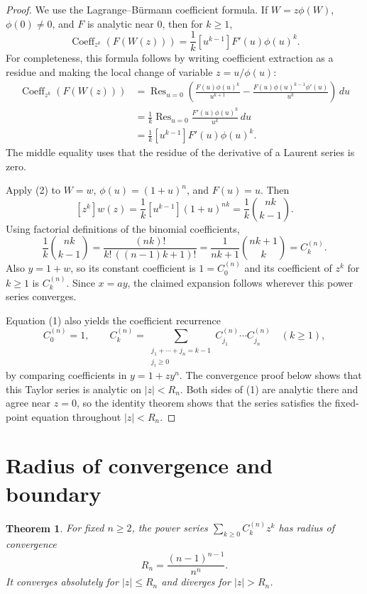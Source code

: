 \documentclass[11pt,a4paper]{article}
\newtheorem{theorem}{Theorem}
\begin{document}
\begin{proof}
We use the Lagrange--B\"urmann coefficient formula. If
$W=z\phi(W)$, $\phi(0)\neq 0$, and $F$ is analytic near $0$, then for
$k\geq 1$,
\[
\operatorname{Coeff}_{z^k}\!\left(F(W(z))\right)
=\frac{1}{k}[u^{k-1}]F'(u)\phi(u)^k. \tag{2}
\]
For completeness, this formula follows by writing coefficient extraction
as a residue and making the local change of variable
$z=u/\phi(u)$:
\[
\begin{aligned}
\operatorname{Coeff}_{z^k}\!\left(F(W(z))\right)
&=\operatorname{Res}_{u=0}
\left(
\frac{F(u)\phi(u)^k}{u^{k+1}}
-\frac{F(u)\phi(u)^{k-1}\phi'(u)}{u^k}
\right)\,du\\
&=\frac{1}{k}\operatorname{Res}_{u=0}
\frac{F'(u)\phi(u)^k}{u^k}\,du\\
&=\frac{1}{k}[u^{k-1}]F'(u)\phi(u)^k.
\end{aligned}
\]
The middle equality uses that the residue of the derivative of a
Laurent series is zero.

Apply (2) to $W=w$, $\phi(u)=(1+u)^n$, and $F(u)=u$. Then
\[
[z^k]w(z)=\frac{1}{k}[u^{k-1}](1+u)^{nk}
=\frac{1}{k}\binom{nk}{k-1}.
\]
Using factorial definitions of the binomial coefficients,
\[
\frac{1}{k}\binom{nk}{k-1}
=\frac{(nk)!}{k!\,((n-1)k+1)!}
=\frac{1}{nk+1}\binom{nk+1}{k}
=C_k^{(n)}.
\]
Also $y=1+w$, so its constant coefficient is $1=C_0^{(n)}$ and its
coefficient of $z^k$ for $k\geq1$ is $C_k^{(n)}$. Since $x=ay$, the
claimed expansion follows wherever this power series converges.

Equation (1) also yields the coefficient recurrence
\[
C_0^{(n)}=1,\qquad
C_k^{(n)}
=\sum_{\substack{j_1+\cdots+j_n=k-1\\j_i\geq0}}
  C_{j_1}^{(n)}\cdots C_{j_n}^{(n)}
\quad(k\geq1), \tag{3}
\]
by comparing coefficients in $y=1+zy^n$. The convergence proof below
shows that this Taylor series is analytic on $|z|<R_n$. Both sides of
(1) are analytic there and agree near $z=0$, so the identity theorem
shows that the series satisfies the fixed-point equation throughout
$|z|<R_n$.
\end{proof}

\section{Radius of convergence and boundary}
\begin{theorem}
For fixed $n\geq2$, the power series $\sum_{k\geq0}C_k^{(n)}z^k$ has
radius of convergence
\[
R_n=\frac{(n-1)^{n-1}}{n^n}.
\]
It converges absolutely for $|z|\leq R_n$ and diverges for $|z|>R_n$.
\end{theorem}
\end{document}
